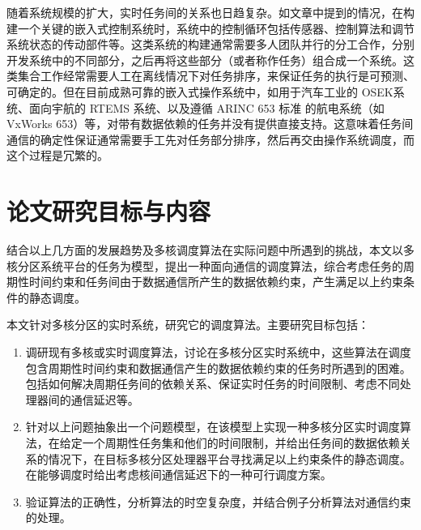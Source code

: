 随着系统规模的扩大，实时任务间的关系也日趋复杂。如文章\cite{Without}中提到的情况，在构建一个关键的嵌入式控制系统时，系统中的控制循环包括传感器、控制算法和调节系统状态的传动部件等。这类系统的构建通常需要多人团队并行的分工合作，分别开发系统中的不同部分，之后再将这些部分（或者称作任务）组合成一个系统。这类集合工作经常需要人工在离线情况下对任务排序，来保证任务的执行是可预测、可确定的。但在目前成熟可靠的嵌入式操作系统中，如用于汽车工业的 OSEK系统、面向宇航的 RTEMS 系统、以及遵循 ARINC 653 标准 的航电系统（如 VxWorks 653）等，对带有数据依赖的任务并没有提供直接支持。这意味着任务间通信的确定性保证通常需要手工先对任务部分排序，然后再交由操作系统调度，而这个过程是冗繁的。



\section{论文研究目标与内容}


结合以上几方面的发展趋势及多核调度算法在实际问题中所遇到的挑战，本文以多核分区系统平台的任务为模型，提出一种面向通信的调度算法，综合考虑任务的周期性时间约束和任务间由于数据通信所产生的数据依赖约束，产生满足以上约束条件的静态调度。

本文针对多核分区的实时系统，研究它的调度算法。主要研究目标包括：
\begin{enumerate}
\item	调研现有多核或实时调度算法，讨论在多核分区实时系统中，这些算法在调度包含周期性时间约束和数据通信产生的数据依赖约束的任务时所遇到的困难。包括如何解决周期任务间的依赖关系、保证实时任务的时间限制、考虑不同处理器间的通信延迟等。
\item	针对以上问题抽象出一个问题模型，在该模型上实现一种多核分区实时调度算法，在给定一个周期性任务集和他们的时间限制，并给出任务间的数据依赖关系的情况下，在目标多核分区处理器平台寻找满足以上约束条件的静态调度。在能够调度时给出考虑核间通信延迟下的一种可行调度方案。
\item	验证算法的正确性，分析算法的时空复杂度，并结合例子分析算法对通信约束的处理。
\end{enumerate}


